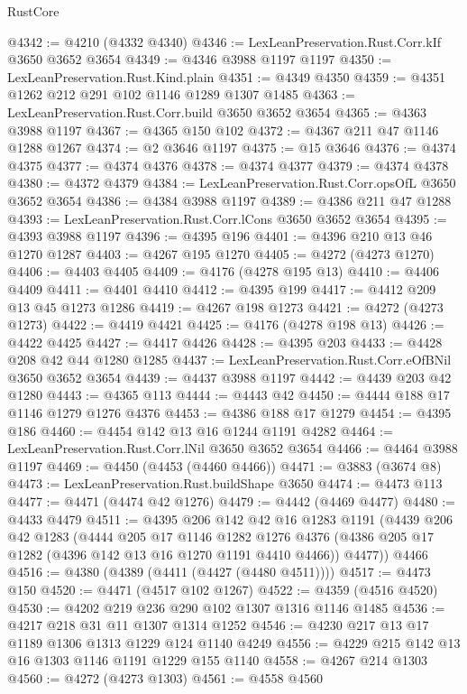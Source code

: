 \begin{lexlean}{RustCore}
\begin{coremodule}
@4342 := @4210 (@4332 @4340)
@4346 := LexLeanPreservation.Rust.Corr.kIf @3650 @3652 @3654
@4349 := @4346 @3988 @1197 @1197
@4350 := LexLeanPreservation.Rust.Kind.plain
@4351 := @4349 @4350
@4359 := @4351 @1262 @212 @291 @102 @1146 @1289 @1307 @1485
@4363 := LexLeanPreservation.Rust.Corr.build @3650 @3652 @3654
@4365 := @4363 @3988 @1197
@4367 := @4365 @150 @102
@4372 := @4367 @211 @47 @1146 @1288 @1267
@4374 := @2 @3646 @1197
@4375 := @15 @3646
@4376 := @4374 @4375
@4377 := @4374 @4376
@4378 := @4374 @4377
@4379 := @4374 @4378
@4380 := @4372 @4379
@4384 := LexLeanPreservation.Rust.Corr.opsOfL @3650 @3652 @3654
@4386 := @4384 @3988 @1197
@4389 := @4386 @211 @47 @1288
@4393 := LexLeanPreservation.Rust.Corr.lCons @3650 @3652 @3654
@4395 := @4393 @3988 @1197
@4396 := @4395 @196
@4401 := @4396 @210 @13 @46 @1270 @1287
@4403 := @4267 @195 @1270
@4405 := @4272 (@4273 @1270)
@4406 := @4403 @4405
@4409 := @4176 (@4278 @195 @13)
@4410 := @4406 @4409
@4411 := @4401 @4410
@4412 := @4395 @199
@4417 := @4412 @209 @13 @45 @1273 @1286
@4419 := @4267 @198 @1273
@4421 := @4272 (@4273 @1273)
@4422 := @4419 @4421
@4425 := @4176 (@4278 @198 @13)
@4426 := @4422 @4425
@4427 := @4417 @4426
@4428 := @4395 @203
@4433 := @4428 @208 @42 @44 @1280 @1285
@4437 := LexLeanPreservation.Rust.Corr.eOfBNil @3650 @3652 @3654
@4439 := @4437 @3988 @1197
@4442 := @4439 @203 @42 @1280
@4443 := @4365 @113
@4444 := @4443 @42
@4450 := @4444 @188 @17 @1146 @1279 @1276 @4376
@4453 := @4386 @188 @17 @1279
@4454 := @4395 @186
@4460 := @4454 @142 @13 @16 @1244 @1191 @4282
@4464 := LexLeanPreservation.Rust.Corr.lNil @3650 @3652 @3654
@4466 := @4464 @3988 @1197
@4469 := @4450 (@4453 (@4460 @4466))
@4471 := @3883 (@3674 @8)
@4473 := LexLeanPreservation.Rust.buildShape @3650
@4474 := @4473 @113
@4477 := @4471 (@4474 @42 @1276)
@4479 := @4442 (@4469 @4477)
@4480 := @4433 @4479
@4511 := @4395
    @206
    @142
    @42
    @16
    @1283
    @1191
    (@4439
      @206
      @42
      @1283
      (@4444
        @205
        @17
        @1146
        @1282
        @1276
        @4376
        (@4386 @205 @17 @1282 (@4396 @142 @13 @16 @1270 @1191 @4410 @4466))
        @4477))
    @4466
@4516 := @4380 (@4389 (@4411 (@4427 (@4480 @4511))))
@4517 := @4473 @150
@4520 := @4471 (@4517 @102 @1267)
@4522 := @4359 (@4516 @4520)
@4530 := @4202 @219 @236 @290 @102 @1307 @1316 @1146 @1485
@4536 := @4217 @218 @31 @11 @1307 @1314 @1252
@4546 := @4230 @217 @13 @17 @1189 @1306 @1313 @1229 @124 @1140 @4249
@4556 := @4229 @215 @142 @13 @16 @1303 @1146 @1191 @1229 @155 @1140
@4558 := @4267 @214 @1303
@4560 := @4272 (@4273 @1303)
@4561 := @4558 @4560

\end{coremodule}
\end{lexlean}
